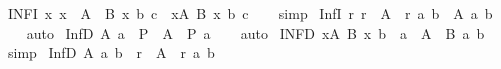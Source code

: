\begin{isabellebody}
\isanewline
{}\isamarkupfalse%
\ INF{}{\isacharunderscore}{\kern0pt}I{\isacharcolon}{\kern0pt}\ {\isachardoublequoteopen}{\isacharparenleft}{\kern0pt}{\isasymAnd}x{\isachardot}{\kern0pt}\ x\ {\isasymin}\ A\ {\isasymLongrightarrow}\ B\ x\ b\ c{\isacharparenright}{\kern0pt}\ {\isasymLongrightarrow}\ {\isacharparenleft}{\kern0pt}{\isasymSqinter}x{\isasymin}A{\isachardot}{\kern0pt}\ B\ x{\isacharparenright}{\kern0pt}\ b\ c{\isachardoublequoteclose}\isanewline
%
\isadelimproof
\ \ %
\endisadelimproof
%
\isatagproof
{}\isamarkupfalse%
\ simp%
\endisatagproof
{\isafoldproof}%
%
\isadelimproof
\isanewline
%
\endisadelimproof
\isanewline
{}\isamarkupfalse%
\ Inf{}{\isacharunderscore}{\kern0pt}I{\isacharcolon}{\kern0pt}\ {\isachardoublequoteopen}{\isacharparenleft}{\kern0pt}{\isasymAnd}r{\isachardot}{\kern0pt}\ r\ {\isasymin}\ A\ {\isasymLongrightarrow}\ r\ a\ b{\isacharparenright}{\kern0pt}\ {\isasymLongrightarrow}\ {\isacharparenleft}{\kern0pt}{\isasymSqinter}A{\isacharparenright}{\kern0pt}\ a\ b{\isachardoublequoteclose}\isanewline
%
\isadelimproof
\ \ %
\endisadelimproof
%
\isatagproof
{}\isamarkupfalse%
\ auto%
\endisatagproof
{\isafoldproof}%
%
\isadelimproof
\isanewline
%
\endisadelimproof
\isanewline
{}\isamarkupfalse%
\ Inf{}{\isacharunderscore}{\kern0pt}D{\isacharcolon}{\kern0pt}\ {\isachardoublequoteopen}{\isacharparenleft}{\kern0pt}{\isasymSqinter}A{\isacharparenright}{\kern0pt}\ a\ {\isasymLongrightarrow}\ P\ {\isasymin}\ A\ {\isasymLongrightarrow}\ P\ a{\isachardoublequoteclose}\isanewline
%
\isadelimproof
\ \ %
\endisadelimproof
%
\isatagproof
{}\isamarkupfalse%
\ auto%
\endisatagproof
{\isafoldproof}%
%
\isadelimproof
\isanewline
%
\endisadelimproof
\isanewline
{}\isamarkupfalse%
\ INF{}{\isacharunderscore}{\kern0pt}D{\isacharcolon}{\kern0pt}\ {\isachardoublequoteopen}{\isacharparenleft}{\kern0pt}{\isasymSqinter}x{\isasymin}A{\isachardot}{\kern0pt}\ B\ x{\isacharparenright}{\kern0pt}\ b\ {\isasymLongrightarrow}\ a\ {\isasymin}\ A\ {\isasymLongrightarrow}\ B\ a\ b{\isachardoublequoteclose}\isanewline
%
\isadelimproof
\ \ %
\endisadelimproof
%
\isatagproof
{}\isamarkupfalse%
\ simp%
\endisatagproof
{\isafoldproof}%
%
\isadelimproof
\isanewline
%
\endisadelimproof
\isanewline
{}\isamarkupfalse%
\ Inf{}{\isacharunderscore}{\kern0pt}D{\isacharcolon}{\kern0pt}\ {\isachardoublequoteopen}{\isacharparenleft}{\kern0pt}{\isasymSqinter}A{\isacharparenright}{\kern0pt}\ a\ b\ {\isasymLongrightarrow}\ r\ {\isasymin}\ A\ {\isasymLongrightarrow}\ r\ a\ b{\isachardoublequoteclose}\isanewline

\end{isabellebody}
